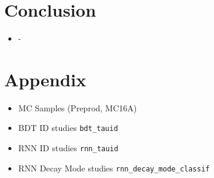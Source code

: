 \section{Conclusion}

\begin{itemize}
\item -
\end{itemize}

\section{Appendix}

\begin{itemize}
\item MC Samples (Preprod, MC16A)
\item BDT ID studies \texttt{bdt\_tauid}
\item RNN ID studies \texttt{rnn\_tauid}
\item RNN Decay Mode studies \texttt{rnn\_decay\_mode\_classif}
\end{itemize}

